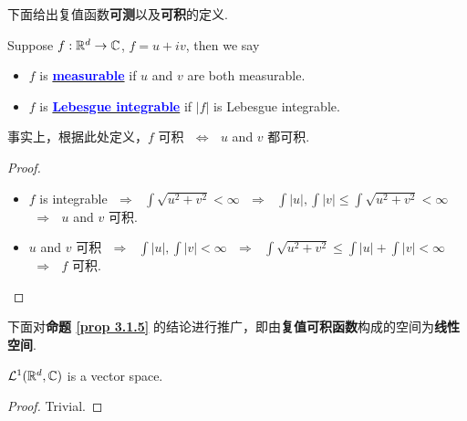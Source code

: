  	\vspace{2em}
 	下面给出复值函数\textbf{可测}以及\textbf{可积}的定义.
 	\begin{defn}\label{def 3.1.7}
 		Suppose $f : \mathbb{R}^d \rightarrow \mathbb{C}$, $f = u + iv$, then we say
 		\begin{itemize}
 			\item $f$ is \underline{\textcolor{blue}{\textbf{measurable}}} if $u$ and $v$ are both measurable.
 			
 			\item $f$ is \underline{\textcolor{blue}{\textbf{Lebesgue integrable}}} if $\left| f \right|$ is Lebesgue integrable.
 		\end{itemize}
 		
 		\vspace{2em}
 		\begin{rmk}
 			事实上，根据此处定义，$f$ 可积 $\,\, \Leftrightarrow \,\,$ $u$ and $v$ 都可积.
 			\begin{proof}
 				\begin{itemize}
 					\item $f$ is integrable $\,\, \Rightarrow \,\,$ $\int{\sqrt{u^2 + v^2}} < \infty$ $\,\, \Rightarrow \,\,$ $\int{\left| u \right|} , \int{\left| v \right|} \leq \int{\sqrt{u^2 + v^2}} < \infty$ $\,\, \Rightarrow \,\,$ $u$ and $v$ 可积.
 					
 					\item $u$ and $v$ 可积 $\,\, \Rightarrow \,\,$ $\int{\left| u \right|} , \int{\left| v \right|} < \infty$ $\,\, \Rightarrow \,\,$ $\int{\sqrt{u^2 + v^2}} \leq \int{\left| u \right|} + \int{\left| v \right|} < \infty$ $\,\, \Rightarrow \,\,$ $f$ 可积.
 				\end{itemize}
 			\end{proof}
 		\end{rmk}
 	\end{defn}
 	
 	\vspace{2em}
 	下面对\textbf{命题 \ref{prop 3.1.5}} 的结论进行推广，即由\textbf{复值可积函数}构成的空间为\textbf{线性空间}.
 	\begin{proposition}\label{prop 3.1.7}
 		$\mathcal{L}^{1}(\mathbb{R}^d , \mathbb{C})$ is a vector space.
 		
 		\vspace{2em}
 		\begin{proof}
 			Trivial.
 		\end{proof}
 	\end{proposition}
 
 
 \newpage
 
